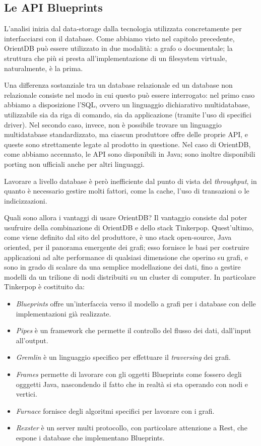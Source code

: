 \subsection{Le API Blueprints}
L'analisi inizia dal data-storage dalla tecnologia utilizzata concretamente per interfacciarsi con il database. Come abbiamo visto nel capitolo precedente, OrientDB può essere utilizzato in due modalità: a grafo o documentale; la struttura che più si presta all'implementazione di un filesystem virtuale, naturalmente, è la prima.

Una differenza sostanziale tra un database relazionale ed un database non relazionale consiste nel modo in cui questo può essere interrogato: nel primo caso abbiamo a disposizione l'SQL, ovvero un linguaggio dichiarativo multidatabase, utilizzabile sia da riga di comando, sia da applicazione (tramite l'uso di specifici driver). Nel secondo caso, invece, non è possibile trovare un linguaggio multidatabase standardizzato, ma ciascun produttore offre delle proprie API, e queste sono strettamente legate al prodotto in questione. Nel caso di OrientDB, come abbiamo accennato, le API sono disponibili in Java; sono inoltre disponibili porting non ufficiali anche per altri linguaggi. 

Lavorare a livello database è però inefficiente dal punto di vista del \emph{throughput}, in quanto è necessario gestire molti fattori, come la cache, l'uso di transazioni o le indicizzazioni.

Quali sono allora i vantaggi di usare OrientDB? Il vantaggio consiste dal poter usufruire della combinazione di OrientDB e dello stack Tinkerpop. Quest'ultimo, come viene definito dal sito del produttore, è uno stack open-source, Java oriented, per il panorama emergente dei grafi; esso fornisce le basi per costruire applicazioni ad alte performance di qualsiasi dimensione che operino su grafi, e sono in grado di scalare da una semplice modellazione dei dati, fino a gestire modelli da un trilione di nodi distribuiti su un cluster di computer. In particolare Tinkerpop è costituito da:
\begin{itemize}
\item \emph{Blueprints} offre un'interfaccia verso il modello a grafi per i database con delle implementazioni già realizzate.
\item \emph{Pipes} è un framework che permette il controllo del flusso dei dati, dall'input all'output.
\item \emph{Gremlin} è un linguaggio specifico per effettuare il \emph{traversing} dei grafi.
\item \emph {Frames} permette di lavorare con gli oggetti Blueprints come fossero degli ogggetti Java, nascondendo il fatto che in realtà si sta operando con nodi e vertici.
\item \emph{Furnace} fornisce degli algoritmi specifici per lavorare con i grafi.
\item \emph{Rexster} è un server multi protocollo, con particolare attenzione a Rest, che espone i database che implementano Blueprints.
\end{itemize}

